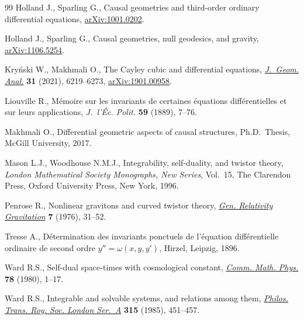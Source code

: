 \documentclass[pdftex]{sigma}%
\numberwithin{equation}{section}
\begin{document}
\begin{thebibliography}{99}
Holland J., Sparling G., Causal geometries and third-order ordinary
 differential equations, \href{https://arxiv.org/abs/1001.0202}{arXiv:1001.0202}.

Holland J., Sparling G., Causal geometries, null geodesics, and gravity,
 \href{https://arxiv.org/abs/1106.5254}{arXiv:1106.5254}.

Kry\'nski W., Makhmali O., The {C}ayley cubic and differential equations,
 \href{https://doi.org/10.1007/s12220-020-00525-9}{\textit{J.~Geom. Anal.}} \textbf{31} (2021), 6219--6273, \href{https://arxiv.org/abs/1901.00958}{arXiv:1901.00958}.

Liouville R., M\'emoire sur les invariants de certaines \'equations
 diff\'erentielles et sur leurs applications, \textit{J.~l'\'Ec. Polit.}
 \textbf{59} (1889), 7--76.

Makhmali O., Differential geometric aspects of causal structures, Ph.D.~Thesis,
 {M}cGill University, 2017.

Mason L.J., Woodhouse N.M.J., Integrability, self-duality, and twistor theory,
 \textit{London Mathematical Society Monographs, New Series}, Vol.~15, The
 Clarendon Press, Oxford University Press, New York, 1996.

Penrose R., Nonlinear gravitons and curved twistor theory, \href{https://doi.org/10.1007/bf00762011}{\textit{Gen.
 Relativity Gravitation}} \textbf{7} (1976), 31--52.

Tresse A., D\'etermination des invariants ponctuels de l'\'equation
 diff\'erentielle ordinaire de second ordre $y'' = \omega(x,y,y')$, Hirzel,
 Leipzig, 1896.

Ward R.S., Self-dual space-times with cosmological constant, \href{https://doi.org/10.1007/BF01941967}{\textit{Comm.
 Math. Phys.}} \textbf{78} (1980), 1--17.

Ward R.S., Integrable and solvable systems, and relations among them,
 \href{https://doi.org/10.1098/rsta.1985.0051}{\textit{Philos. Trans. Roy. Soc. London Ser.~A}} \textbf{315} (1985),
 451--457.

\end{thebibliography}\LastPageEnding
\end{document}
